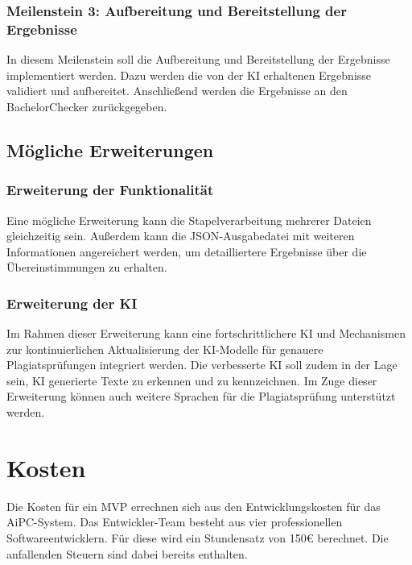 \subsubsection{Meilenstein 3: Aufbereitung und Bereitstellung der Ergebnisse}
In diesem Meilenstein soll die Aufbereitung und Bereitstellung der Ergebnisse implementiert werden.
Dazu werden die von der \ac{KI} erhaltenen Ergebnisse validiert und aufbereitet.
Anschließend werden die Ergebnisse an den BachelorChecker zurückgegeben.

\subsection{Mögliche Erweiterungen}\label{subsec:moegliche-erweiterungen}

\subsubsection{Erweiterung der Funktionalität}\label{subsubsec:-erweiterung-der-funktionalitat}
Eine mögliche Erweiterung kann die Stapelverarbeitung mehrerer Dateien gleichzeitig sein.
Außerdem kann die \ac{JSON}-Ausgabedatei mit weiteren Informationen angereichert werden, um detailliertere Ergebnisse über die Übereinstimmungen zu erhalten.

\subsubsection{Erweiterung der KI}\label{subsubsec:-erweiterung-der-ki}
Im Rahmen dieser Erweiterung kann eine fortschrittlichere \ac{KI} und Mechanismen zur kontinuierlichen Aktualisierung der \ac{KI}-Modelle für genauere Plagiatsprüfungen integriert werden.
Die verbesserte \ac{KI} soll zudem in der Lage sein, \ac{KI} generierte Texte zu erkennen und zu kennzeichnen.
Im Zuge dieser Erweiterung können auch weitere Sprachen für die Plagiatsprüfung unterstützt werden.


\section{Kosten}\label{sec:kosten}

Die Kosten für ein \ac{MVP} errechnen sich aus den Entwicklungskosten für das \ac{AiPC}-System.
Das Entwickler-Team besteht aus vier professionellen Softwareentwicklern.
Für diese wird ein Stundensatz von 150\euro{} berechnet.
Die anfallenden Steuern sind dabei bereits enthalten.


